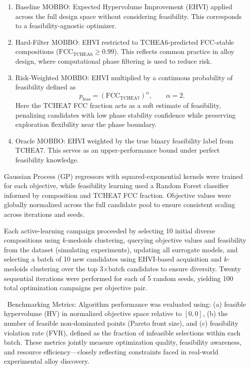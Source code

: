 \documentclass[letterpaper,4pt,times,preprint]{elsarticle}
\begin{document}
\begin{enumerate}
    \item Baseline MOBBO: Expected Hypervolume Improvement (EHVI) applied across the full design space without considering feasibility. This corresponds to a feasibility-agnostic optimizer.
    \item Hard-Filter MOBBO: EHVI restricted to TCHEA6-predicted FCC-stable compositions ($\text{FCC}_{\text{TCHEA6}} \geq 0.99$). This reflects common practice in alloy design, where computational phase filtering is used to reduce risk.
    \item Risk-Weighted MOBBO: EHVI multiplied by a continuous probability of feasibility defined as  
    \[
    p_{\text{feas}} = \left(\text{FCC}_{\text{TCHEA7}}\right)^{\alpha}, \qquad \alpha = 2.
    \]
    Here the TCHEA7 FCC fraction acts as a soft estimate of feasibility, penalizing candidates with low phase stability confidence while preserving exploration flexibility near the phase boundary.
    \item Oracle MOBBO: EHVI weighted by the true binary feasibility label from TCHEA7. This serves as an upper-performance bound under perfect feasibility knowledge.
\end{enumerate}

Gaussian Process (GP) regressors with squared-exponential kernels were trained for each objective, while feasibility learning used a Random Forest classifier informed by composition and TCHEA7 FCC fraction. Objective values were globally normalized across the full candidate pool to ensure consistent scaling across iterations and seeds.

Each active-learning campaign proceeded by selecting 10 initial diverse compositions using $k$-medoids clustering, querying objective values and feasibility from the dataset (simulating experiments), updating all surrogate models, and selecting a batch of 10 new candidates using EHVI-based acquisition and $k$-medoids clustering over the top 3$\times$batch candidates to ensure diversity. Twenty sequential iterations were performed for each of 5 random seeds, yielding 100 total optimization campaigns per objective pair.

\vspace{6pt}
\noindent\ Benchmarking Metrics:  
Algorithm performance was evaluated using: (a) feasible hypervolume (HV) in normalized objective space relative to $[0, 0]$, (b) the number of feasible non-dominated points (Pareto front size), and (c) feasibility violation rate (FVR), defined as the fraction of infeasible selections within each batch. These metrics jointly measure optimization quality, feasibility awareness, and resource efficiency—closely reflecting constraints faced in real-world experimental alloy discovery.
\end{document}
